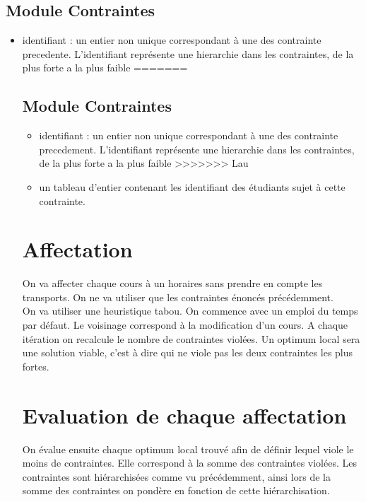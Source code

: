 \documentclass[a4paper,11pt]{article}
\begin{document}
	\subsection{Module Contraintes}                                                           		\begin{itemize}
			\item identifiant : un entier non unique correspondant à une des contrainte precedente. L'identifiant représente une hierarchie dans les contraintes, de la plus forte a la plus faible 
=======
	\subsection{Module Contraintes}  
		\begin{itemize}
			\item identifiant : un entier non unique correspondant à une des contrainte precedement. L'identifiant représente une hierarchie dans les contraintes, de la plus forte a la plus faible 
>>>>>>> Lau
			\item un tableau d'entier contenant les identifiant des étudiants sujet à cette contrainte.
		\end{itemize}
\section{Affectation}
	On va affecter chaque cours à un horaires sans prendre en compte les transports. On ne va utiliser que les contraintes énoncés précédemment. \\
	On va utiliser une heuristique tabou. On commence avec un emploi du temps par défaut. Le voisinage correspond à la modification d'un cours. A chaque itération on recalcule le nombre de contraintes violées. Un optimum local sera une solution viable, c'est à dire qui ne viole pas les deux contraintes les plus fortes. 
	
\section{Evaluation de chaque affectation}
	On évalue ensuite chaque optimum local trouvé afin de définir lequel viole le moins de contraintes. Elle correspond à la somme des contraintes violées. Les contraintes sont hiérarchisées comme vu précédemment, ainsi lors de la somme des contraintes on pondère en fonction de cette hiérarchisation.
	

\end{itemize}
\end{document}
